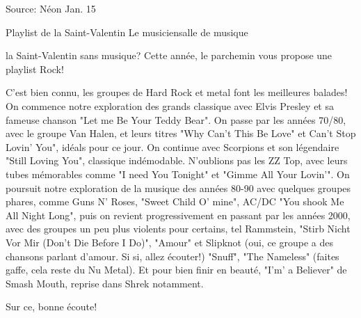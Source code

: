 \begin{article*}
\begin{spacing}{.98}
{Source: Néon Jan. 15}
\end{spacing}
\end{article*}




\newpage




\vspace*{-1.9cm}\begin{article}
{Playlist de la Saint-Valentin\saintValentin}
{Le musicien}{salle de musique}

\begin{spacing}{.9}
 la Saint-Valentin sans musique? Cette année, le parchemin vous propose une playlist Rock! 

C'est bien connu, les groupes de Hard Rock et metal font les meilleures balades! On commence notre exploration des grands classique avec Elvis Presley et sa fameuse chanson "Let me Be Your Teddy Bear". On passe par les années 70/80, avec le groupe  Van Halen, et leurs titres "Why Can't This Be Love" et Can't Stop Lovin' You", idéals pour ce jour. On continue avec Scorpions et son légendaire "Still Loving You", classique indémodable. N'oublions pas les ZZ Top, avec leurs tubes mémorables comme "I need You Tonight" et "Gimme All Your Lovin'". On poursuit notre exploration de la musique des années 80-90 avec quelques groupes phares, comme Guns N' Roses, "Sweet Child O' mine", AC/DC "You shook Me All Night Long", puis on revient progressivement en passant par les années 2000, avec des groupes un peu plus violents pour certains, tel Rammstein, "Stirb Nicht Vor Mir (Don't Die Before I Do)", "Amour" et Slipknot (oui, ce groupe a des chansons parlant d'amour. Si si, allez écouter!) "Snuff", "The Nameless" (faites gaffe, cela reste du Nu Metal). Et pour bien finir en beauté, "I'm' a Believer" de Smash Mouth, reprise dans Shrek notamment.

Sur ce, bonne écoute!
\end{spacing}
\end{article}


